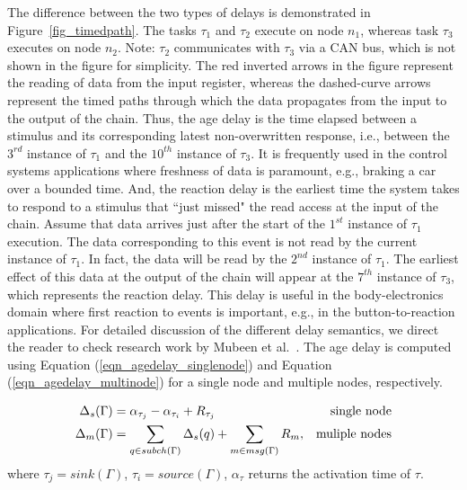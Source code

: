 The difference between the two types of delays is demonstrated in Figure~\ref{fig_timedpath}. The tasks $\tau_1$ and $\tau_2$ execute on node $n_1$, whereas task $\tau_3$ executes on node $n_2$. Note: $\tau_2$ communicates with $\tau_3$ via a CAN bus, which is not shown in the figure for simplicity. The red inverted arrows in the figure represent the reading of data from the input register, whereas the dashed-curve arrows represent the timed paths through which the data propagates from the input to the output of the chain. Thus, the age delay is the time elapsed between a stimulus and its corresponding latest non-overwritten response, i.e., between the $3^{rd}$ instance of  $\tau_1$  and the $10^{th}$ instance of $\tau_3$. It is frequently used in the control systems applications where freshness of data is paramount, e.g., braking a car over a bounded time. And, the reaction delay is the earliest time the system takes to respond to a stimulus that ``just missed" the read access at the input of the chain. Assume that data arrives just after the start of the $1^{st}$ instance of $\tau_1$ execution. The data corresponding to this event is not read by the current instance of $\tau_1$. In fact, the data will be read by the $2^{nd}$ instance of $\tau_1$. The earliest effect of this data at the output of the chain will appear at the $7^{th}$ instance of $\tau_3$, which represents the reaction delay. This delay is useful in the body-electronics domain where first reaction to events is important, e.g., in the button-to-reaction applications. For detailed discussion of the different delay semantics, we direct the reader to check research work by Mubeen et al.~\cite{mubeen2013support}. The age delay is computed using Equation (\ref{eqn_agedelay_singlenode}) and Equation (\ref{eqn_agedelay_multinode}) for a single node and multiple nodes, respectively.

\begin{align}
	\label{eqn_agedelay_singlenode}
	\Delta_{s}(\Gamma) &= \ssb{\alpha}[\tau_j]-\ssb{\alpha}[\tau_i] + \ssb{R}[\tau_j]&\text{single node}\\
	\label{eqn_agedelay_multinode}
	\Delta_{m}(\Gamma)&=\sum_{q\in subch(\Gamma)}{\Delta_s(q)} + \sum_{m\in msg(\Gamma)}{R_m}, &\text{muliple nodes}
\end{align}
where $\tau_j = sink(\Gamma)$, $\tau_i=source(\Gamma)$, $\alpha_\tau$ returns the activation time of $\tau$.

